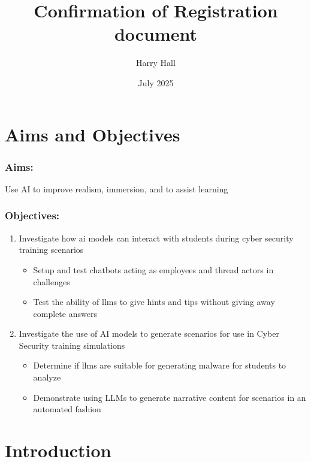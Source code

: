 \documentclass{article}
\title{Confirmation of Registration document}
\author{Harry Hall}
\date{July 2025}
\begin{document}
\maketitle

\section{Aims and Objectives}
\subsubsection*{Aims:}
Use AI to improve realism, immersion, and to assist learning

\subsubsection*{Objectives:}
\begin{enumerate}
    \item Investigate how \acrshort{ai} models can interact with students during cyber security training scenarios
    \begin{itemize}
        \item Setup and test chatbots acting as employees and thread actors in challenges
        \item Test the ability of \acrshort{llm}s to give hints and tips without giving away complete answers
    \end{itemize}
    \item Investigate the use of AI models to generate scenarios for use in Cyber Security training simulations
    \begin{itemize}
        \item Determine if \acrshort{llm}s are suitable for generating malware for students to analyze
        \item Demonstrate using LLMs to generate narrative content for scenarios in an automated fashion
    \end{itemize}
\end{enumerate}

\printglossary[type=\acronymtype]
\printbibliography{}

\section{Introduction}
\end{document}
